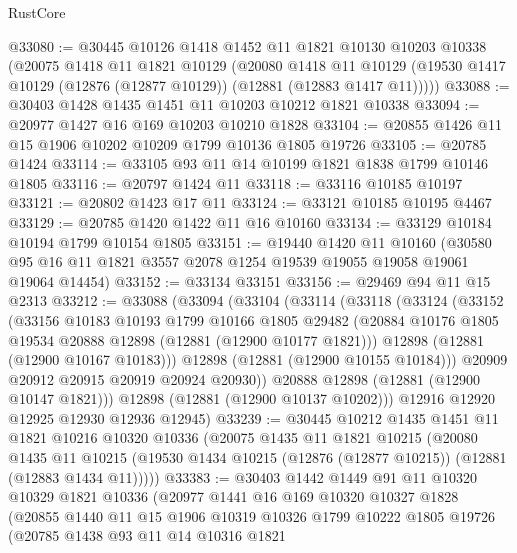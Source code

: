 \begin{lexlean}{RustCore}
\begin{coremodule}
@33080 := @30445
    @10126
    @1418
    @1452
    @11
    @1821
    @10130
    @10203
    @10338
    (@20075
      @1418
      @11
      @1821
      @10129
      (@20080
        @1418
        @11
        @10129
        (@19530 @1417 @10129 (@12876 (@12877 @10129)) (@12881 (@12883 @1417 @11)))))
@33088 := @30403 @1428 @1435 @1451 @11 @10203 @10212 @1821 @10338
@33094 := @20977 @1427 @16 @169 @10203 @10210 @1828
@33104 := @20855 @1426 @11 @15 @1906 @10202 @10209 @1799 @10136 @1805 @19726
@33105 := @20785 @1424
@33114 := @33105 @93 @11 @14 @10199 @1821 @1838 @1799 @10146 @1805
@33116 := @20797 @1424 @11
@33118 := @33116 @10185 @10197
@33121 := @20802 @1423 @17 @11
@33124 := @33121 @10185 @10195 @4467
@33129 := @20785 @1420 @1422 @11 @16 @10160
@33134 := @33129 @10184 @10194 @1799 @10154 @1805
@33151 := @19440
    @1420
    @11
    @10160
    (@30580 @95 @16 @11 @1821 @3557 @2078 @1254 @19539 @19055 @19058 @19061 @19064 @14454)
@33152 := @33134 @33151
@33156 := @29469 @94 @11 @15 @2313
@33212 := @33088
    (@33094
      (@33104
        (@33114
          (@33118
            (@33124
              (@33152
                (@33156
                  @10183
                  @10193
                  @1799
                  @10166
                  @1805
                  @29482
                  (@20884 @10176 @1805 @19534 @20888 @12898 (@12881 (@12900 @10177 @1821)))
                  @12898
                  (@12881 (@12900 @10167 @10183)))
                @12898
                (@12881 (@12900 @10155 @10184)))
              @20909
              @20912
              @20915
              @20919
              @20924
              @20930))
          @20888
          @12898
          (@12881 (@12900 @10147 @1821)))
        @12898
        (@12881 (@12900 @10137 @10202)))
      @12916
      @12920
      @12925
      @12930
      @12936
      @12945)
@33239 := @30445
    @10212
    @1435
    @1451
    @11
    @1821
    @10216
    @10320
    @10336
    (@20075
      @1435
      @11
      @1821
      @10215
      (@20080
        @1435
        @11
        @10215
        (@19530 @1434 @10215 (@12876 (@12877 @10215)) (@12881 (@12883 @1434 @11)))))
@33383 := @30403
    @1442
    @1449
    @91
    @11
    @10320
    @10329
    @1821
    @10336
    (@20977
      @1441
      @16
      @169
      @10320
      @10327
      @1828
      (@20855
        @1440
        @11
        @15
        @1906
        @10319
        @10326
        @1799
        @10222
        @1805
        @19726
        (@20785
          @1438
          @93
          @11
          @14
          @10316
          @1821

\end{coremodule}
\end{lexlean}
